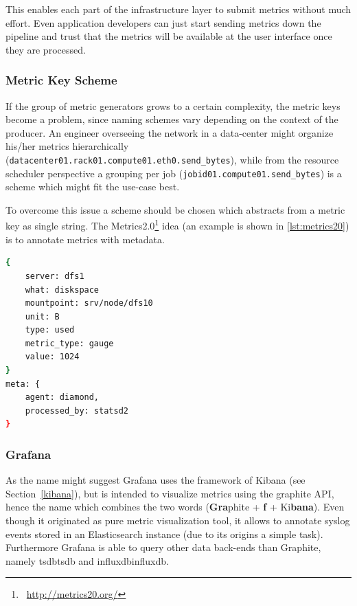 This enables each part of the infrastructure layer to submit metrics without much effort. Even application developers can just start sending metrics down the pipeline and
trust that the metrics will be available at the user interface once they are processed.

\subsubsection{Metric Key Scheme}

If the group of metric generators grows to a certain complexity, the metric keys become a problem, since naming schemes vary depending on the context of
the producer. An engineer overseeing the network in a data-center might organize his/her metrics hierarchically (\lstinline{datacenter01.rack01.compute01.eth0.send_bytes}), while from the
resource scheduler perspective a grouping per job (\lstinline{jobid01.compute01.send_bytes}) is a scheme which might fit the use-case best.

To overcome this issue a scheme should be chosen which abstracts from a metric key as single string.
The Metrics2.0\footnote{\Mundus~\url{http://metrics20.org/}} idea (an example is shown in \autoref{lst:metrics20}) is to annotate metrics with metadata.

\begin{lstlisting}[language=bash,
    caption={Metrics2.0 formatted metric},
    label={lst:metrics20}]
{
    server: dfs1
    what: diskspace
    mountpoint: srv/node/dfs10
    unit: B
    type: used
    metric_type: gauge
    value: 1024
}
meta: {
    agent: diamond,
    processed_by: statsd2
}
\end{lstlisting}

\subsubsection{Grafana}
As the name might suggest Grafana uses the framework of Kibana (see Section~\ref{kibana}),
but is intended to visualize metrics using the \gls{graphite} API,
hence the name which combines the two words (\textbf{Gra}phite + \textbf{f} + Ki\textbf{bana}).
Even though it originated as pure metric visualization tool, it allows to annotate syslog events stored in an Elasticsearch instance (due to its origins a simple task).
Furthermore Grafana is able to query other data back-ends than Graphite, namely \gls{tsdb}\glsdesc{tsdb} and \gls{influxdb}\glsdesc{influxdb}.
